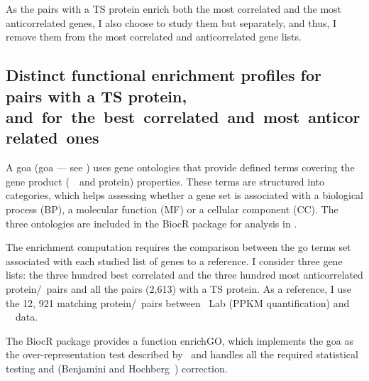 As the pairs with a \gls{TS} protein enrich both the most correlated
and the most anticorrelated genes,
I also choose to study them but separately,
and thus,
I remove them from the most correlated and anticorrelated gene lists.

\subsection{Distinct functional enrichment profiles
for pairs with a TS protein,
and~for~the~best~correlated~and~most~anticorrelated~ones}

A \glsdesc{goa} (\gls{goa} --- see )
uses gene ontologies that provide defined terms
covering the gene product (\ie\ \mRNA\ and protein) properties.
These terms are structured into categories,
which helps assessing whether a gene set is associated with
a biological process (BP), a molecular function (MF) or a cellular component (CC).
The three ontologies are included
in the \gls{BiocR} package 
for analysis in .

The enrichment computation requires
the comparison between the \gls{go} terms set associated
with each studied list of genes to a reference.
I consider three gene lists:
the three hundred best correlated and
the three hundred most anticorrelated protein/\mRNA\ pairs
and all the pairs (2,613) with a \gls{TS} protein.
As a reference, I use the 12, 921 matching protein/\mRNA\ pairs
between \pandey\ Lab (\gls{PPKM} quantification) and \uhlen\ \etal\ data.

The \gls{BiocR} package 
provides a function \textsf{enrichGO},
which implements the \gls{goa} as the over-representation test
described by~\citet{Boyle2004-dh}
and handles all the required statistical testing
and (Benjamini and Hochberg~) correction.

